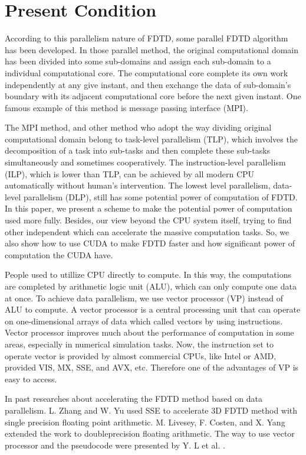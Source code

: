 \section{Present Condition}

According to this parallelism nature of FDTD, some parallel FDTD algorithm\cite{mpi1,mpi2,mpi3,mpi4} has been developed. In those parallel method, the original computational domain has been divided into some sub-domains and assign each sub-domain to a individual computational core. The computational core complete its own work independently at any give instant, and then exchange the data of sub-domain's boundary with its adjacent computational core before the next given instant. One famous example of this method is message passing interface (MPI).

The MPI method, and other method who adopt the way dividing original computational domain belong to task-level parallelism (TLP), which involves the decomposition of a task into sub-tasks and then complete these sub-tasks simultaneously and sometimes cooperatively. The instruction-level parallelism (ILP), which is lower than TLP, can be achieved by all modern CPU automatically without human's intervention. The lowest level parallelism, data-level parallelism (DLP), still has some potential power of computation of FDTD. In this paper, we present a scheme to make the potential power of computation used more fully. Besides, our view beyond the CPU system itself, trying to find other independent which can accelerate the massive computation tasks. So, we also show how to use CUDA to make FDTD faster and how significant power of computation the CUDA have.

People used to utillize CPU directly to compute. In this way, the computations are completed by arithmetic logic unit (ALU), which can only compute one data at once. To achieve data parallelism, we use vector processor (VP) instead of ALU to compute. A vector processor is a  central processing unit that can operate on one-dimensional arrays of data which called vectors by using instructions. Vector processor improves much about the performance of computation in some areas, especially in numerical simulation tasks. Now, the instruction set to operate vector is provided by
almost commercial CPUs, like Intel or AMD, provided VIS, MX, SSE, and AVX, etc. Therefore one of the advantages of VP is easy to access.

In past researches about accelerating the FDTD method based on data parallelism. L. Zhang and W. Yu \cite{LZhangandWYu} used SSE to accelerate 3D FDTD method with single precision floating point arithmetic. M. Livesey, F. Costen, and X. Yang \cite{Doubleprecision} extended the work to doubleprecision floating arithmetic. The way to use vector processor and the pseudocode were
presented by Y. L et al. \cite{AdvancedFDTDMethod}.

